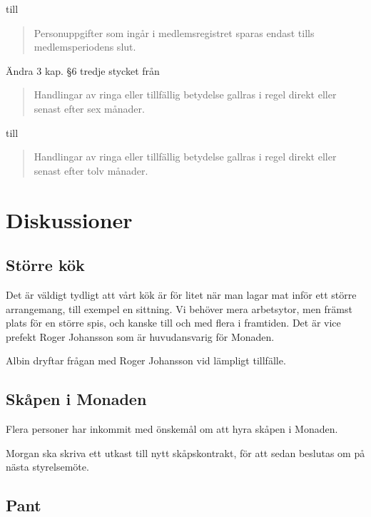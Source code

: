 \documentclass[protokoll]{dvd}
\begin{document}
\begin{beslut}
    till

    \blockquote[][]{%
        Personuppgifter som ingår i medlemsregistret sparas endast tills medlemsperiodens slut.
    }

    \item Ändra 3 kap. §6 tredje stycket från

    \blockquote[][]{%
        Handlingar av ringa eller tillfällig betydelse gallras i regel direkt eller senast efter sex månader.
    }

    till

    \blockquote[][]{%
        Handlingar av ringa eller tillfällig betydelse gallras i regel direkt eller senast efter tolv månader.
    }

\end{beslut}

\section{Diskussioner}\label{sec:discussioner}

\subsection{Större kök}

Det är väldigt tydligt att vårt kök är för litet när man lagar mat inför ett större arrangemang, till exempel en sittning.
Vi behöver mera arbetsytor, men främst plats för en större spis, och kanske till och med flera i framtiden.
Det är vice prefekt Roger Johansson som är huvudansvarig för Monaden.

\begin{åtagande}
    \item Albin dryftar frågan med Roger Johansson vid lämpligt tillfälle.
\end{åtagande}

\subsection{Skåpen i Monaden}

Flera personer har inkommit med önskemål om att hyra skåpen i Monaden.

\begin{åtagande}
    \item Morgan ska skriva ett utkast till nytt skåpskontrakt, för att sedan beslutas om på nästa styrelsemöte.
\end{åtagande}

\subsection{Pant}
\end{document}
